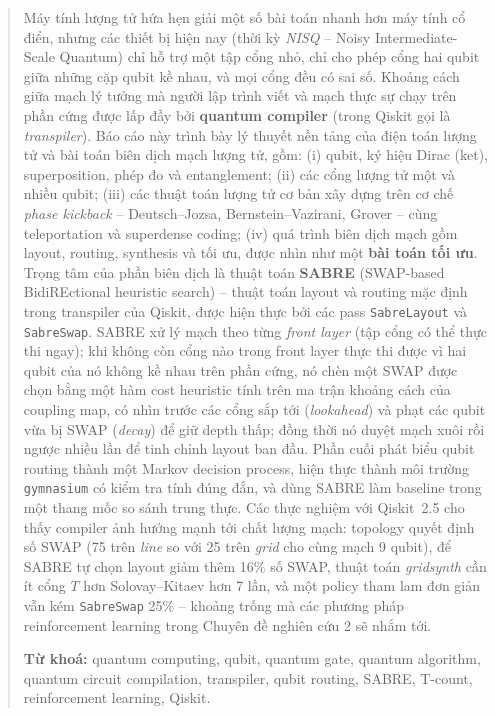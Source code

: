 \documentclass[11pt,a4paper]{article}
\theoremstyle{definition}
\newcommand{\code}[1]{\texttt{#1}}
\begin{document}
\begin{abstract}
Máy tính lượng tử hứa hẹn giải một số bài toán nhanh hơn máy tính cổ điển, nhưng các thiết bị
hiện nay (thời kỳ \emph{NISQ} -- Noisy Intermediate-Scale Quantum) chỉ hỗ trợ một tập cổng nhỏ,
chỉ cho phép cổng hai qubit giữa những cặp qubit kề nhau, và mọi cổng đều có sai số. Khoảng cách
giữa mạch lý tưởng mà người lập trình viết và mạch thực sự chạy trên phần cứng được lấp đầy bởi
\textbf{quantum compiler} (trong Qiskit gọi là \emph{transpiler}). Báo cáo này trình bày lý thuyết
nền tảng của điện toán lượng tử và bài toán biên dịch mạch lượng tử, gồm: (i) qubit, ký hiệu Dirac
(ket), superposition, phép đo và entanglement; (ii) các cổng lượng tử một và nhiều qubit; (iii) các
thuật toán lượng tử cơ bản xây dựng trên cơ chế \emph{phase kickback} -- Deutsch--Jozsa,
Bernstein--Vazirani, Grover -- cùng teleportation và superdense coding; (iv) quá trình biên dịch mạch
gồm layout, routing, synthesis và tối ưu, được nhìn như một \textbf{bài toán tối ưu}. Trọng tâm của
phần biên dịch là thuật toán \textbf{SABRE} (SWAP-based BidiREctional heuristic search) -- thuật toán
layout và routing mặc định trong transpiler của Qiskit, được hiện thực bởi các pass
\code{SabreLayout} và \code{SabreSwap}. SABRE xử lý mạch theo từng \emph{front layer} (tập cổng có
thể thực thi ngay); khi không còn cổng nào trong front layer thực thi được vì hai qubit của nó không
kề nhau trên phần cứng, nó chèn một SWAP được chọn bằng một hàm cost heuristic tính trên ma trận khoảng cách của coupling map, có nhìn
trước các cổng sắp tới (\emph{lookahead}) và phạt các qubit vừa bị SWAP (\emph{decay}) để giữ depth
thấp; đồng thời nó duyệt mạch xuôi rồi ngược nhiều lần để tinh chỉnh layout ban đầu. Phần cuối phát
biểu qubit routing thành một Markov decision process, hiện thực thành môi trường \code{gymnasium} có
kiểm tra tính đúng đắn, và dùng SABRE làm baseline trong một thang mốc so sánh trung thực. Các thực
nghiệm với Qiskit~2.5 cho thấy compiler ảnh hưởng mạnh tới chất lượng mạch: topology quyết định số
SWAP (75 trên \emph{line} so với 25 trên \emph{grid} cho cùng mạch 9 qubit), để SABRE tự chọn layout
giảm thêm 16\% số SWAP, thuật toán \emph{gridsynth} cần ít cổng $T$ hơn Solovay--Kitaev hơn 7 lần,
và một policy tham lam đơn giản vẫn kém \code{SabreSwap} 25\% -- khoảng trống mà các phương pháp
reinforcement learning trong Chuyên đề nghiên cứu 2 sẽ nhắm tới.

\medskip
\noindent\textbf{Từ khoá:} quantum computing, qubit, quantum gate, quantum algorithm, quantum
circuit compilation, transpiler, qubit routing, SABRE, T-count, reinforcement learning, Qiskit.
\end{abstract}

\tableofcontents
\newpage










\clearpage
\appendix


\clearpage

\end{document}
